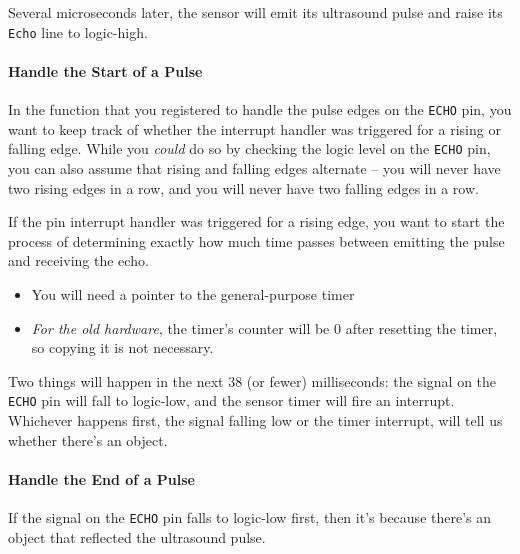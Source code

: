 Several microseconds later, the sensor will emit its ultrasound pulse and raise its \texttt{Echo} line to logic-high.

\paragraph{Handle the Start of a Pulse}
In the function that you registered to handle the pulse edges on the \lstinline{ECHO} pin, you want to keep track of whether the interrupt handler was triggered for a rising or falling edge.
While you \textit{could} do so by checking the logic level on the \lstinline{ECHO} pin, you can also assume that rising and falling edges alternate --
you will never have two rising edges in a row, and you will never have two falling edges in a row.

If the pin interrupt handler was triggered for a rising edge, you want to start the process of determining exactly how much time passes between emitting the pulse and receiving the echo.
\begin{description}
        \begin{itemize}
            \item You will need a pointer to the general-purpose timer
            \item \textit{For the old hardware}, the timer's counter will be 0 after resetting the timer, so copying it is not necessary.
        \end{itemize}
\end{description}

Two things will happen in the next 38 (or fewer) milliseconds: the signal on the \lstinline{ECHO} pin will fall to logic-low, and the sensor timer will fire an interrupt.
Whichever happens first, the signal falling low or the timer interrupt, will tell us whether there's an object.

\paragraph{Handle the End of a Pulse}
If the signal on the \lstinline{ECHO} pin falls to logic-low first, then it's because there's an object that reflected the ultrasound pulse.

